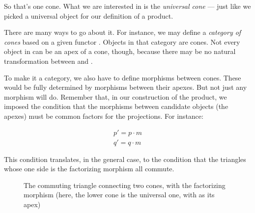 So that's one cone. What we are interested in is the \emph{universal
cone} --- just like we picked a universal object for our definition of a
product.

There are many ways to go about it. For instance, we may define a
\emph{category of cones} based on a given functor . Objects in that
category are cones. Not every object  in  can be an
apex of a cone, though, because there may be no natural transformation
between  and .

To make it a category, we also have to define morphisms between cones.
These would be fully determined by morphisms between their apexes. But
not just any morphism will do. Remember that, in our construction of the
product, we imposed the condition that the morphisms between candidate
objects (the apexes) must be common factors for the projections. For
instance:

\begin{equation*}
\begin{split}
p' = p \cdot m \\
q' = q \cdot m
\end{split}
\end{equation*}

\begin{figure}[H]
    \centering
\end{figure}

This condition translates, in the general case, to the condition that
the triangles whose one side is the factorizing morphism all commute.

\begin{figure}[H]
    \centering
    \captionsetup{labelformat=empty,font=scriptsize}
    \caption{The commuting triangle connecting two cones, with the factorizing
morphism  (here, the lower cone is the universal one, with
 as its apex)}
\end{figure}

